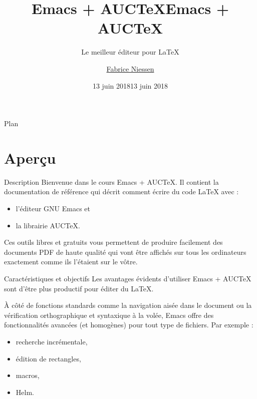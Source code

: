 \documentclass[t]{beamer}
\author{\href{mailto:fniessen@pirilampo.org}{Fabrice Niessen}}
\date{13 juin 2018}
\title{Emacs + AUCTeX}
\subtitle{Le meilleur éditeur pour \LaTeX}
\institute[Pirilampo]{}
\begin{document}
\title{Emacs + AUC\TeX{}}
\date[juin 2018]{13 juin 2018}
\begin{frame}[plain]
\maketitle
\end{frame}
\begin{frame}{Plan}
\tableofcontents
\end{frame}


\section{Aperçu}
\label{sec:orgaea732e}

\begin{frame}[label={sec:org2c51a58}]{Description}
Bienvenue dans le cours Emacs + AUC\TeX{}. Il contient la documentation de
référence qui décrit comment écrire du code \LaTeX{} avec :

\begin{itemize}
\item l'éditeur GNU Emacs et
\item la librairie AUC\TeX{}.
\end{itemize}

Ces outils \alert{libres} et \alert{gratuits} vous permettent de produire facilement des
documents \alert{PDF de haute qualité} qui vont être affichés sur tous les ordinateurs
exactement comme ils l'étaient sur le vôtre.
\end{frame}

\begin{frame}[label={sec:org7f5446d}]{Caractéristiques et objectifs}
Les avantages évidents d'utiliser Emacs + AUC\TeX{} sont d'être \alert{plus productif}
pour éditer du \LaTeX{}.

À côté de fonctions standards comme la navigation aisée dans le document ou la
vérification orthographique et syntaxique à la volée, Emacs offre des
\alert{fonctionnalités avancées} (et homogènes) pour tout \alert{type de fichiers}. Par
exemple :

\begin{itemize}
\item recherche incrémentale,
\item édition de rectangles,
\item macros,
\item Helm.
\end{itemize}
\end{frame}
\end{document}
